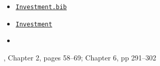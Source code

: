 \begin{itemize}
\item[Bib:] \texttt{\href{http://www.econ2.jhu.edu/people/ccarroll/courses/Choice/Syllabus/Investment.bib}{Investment.bib}}
\item[Handouts:]  \texttt{\href{https://intertemporal-choice.github.io/content/investment}{Investment}}
\item[Readings:]
\end{itemize}

\providecommand{\blf}{\cite{blanchard&fischer:text}}
\providecommand{\ro}{\cite{romer:text}}

\bi
\reqd \blf, Chapter 2, pages 58--69; Chapter 6, pp 291--302
\recm \cite{hall&jorgenson:i}
\reqd \cite{hayashi:q}
\reqd \cite{abel&eberly:unified}
\reqd \cite{chh:reconsider}
\ei

